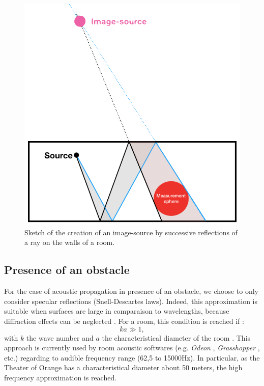 \documentclass[AMA,STIX1COL]{WileyNJD-v2}
\begin{document}
%
\begin{figure}[t]
	\centering
	\includegraphics[width=0.7\linewidth]{schema_SI}
	\caption{Sketch of the creation of an image-source by successive reflections of a ray on the walls of a room.}
	\label{schema_SI}
\end{figure}



\subsection{Presence of an obstacle}
For the case of acoustic propagation in presence of an obstacle, we choose to only consider specular reflections (Snell-Descartes laws). Indeed, this approximation is suitable when surfaces are large in comparaison to wavelengths, because diffraction effects can be neglected \cite{jouhaneau}. For a room, this condition is reached if :
\begin{equation}
ka \gg 1, 
\end{equation}
with $k$ the wave number and $a$ the characteristical diameter of the room \cite{hautes_freq}. This approach is currently used by room acoustic softwares (e.g. \textit{Odeon} \cite{odeon}, \textit{Grasshopper} \cite{grasshopper}, etc.) regarding to audible frequency range (62,5 to 15000Hz). In particular, as the Theater of Orange has a characteristical diameter about 50 meters, the high frequency approximation is reached. 
\end{document}
